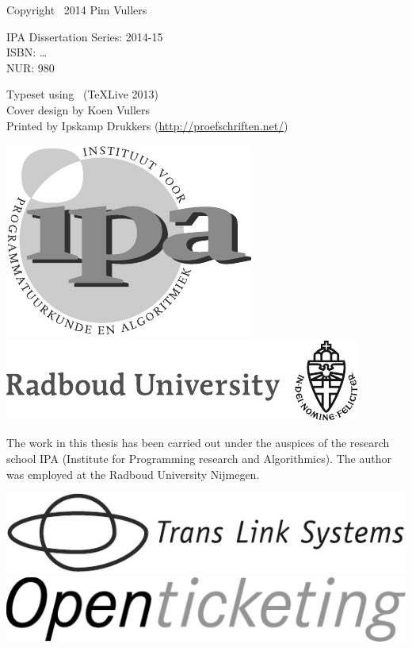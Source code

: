 \thispagestyle{empty}

\noindent
Copyright \textcopyright\ 2014 Pim Vullers \\\null

\noindent
IPA Dissertation Series: 2014-15 \\
ISBN: \dots \\
NUR: 980 \\\null

\noindent 
Typeset using \LaTeXe\ (\TeX Live 2013) \\
Cover design by Koen Vullers \\
Printed by Ipskamp Drukkers (\url{http://proefschriften.net/}) \\\null

\vspace{40mm}

\begin{center}
\includegraphics[scale=.7,valign=M,raise=.5ex]{images/ipalogo}
\qquad
\includegraphics[valign=M,raise=.5ex]{images/radboudlogo}
\end{center}

\noindent
The work in this thesis has been carried out under the auspices of the research school IPA (Institute for Programming research and Algorithmics).
The author was employed at the Radboud University Nijmegen.

\vspace{15mm}

\begin{center}
\includegraphics[width=.45\textwidth,valign=M,raise=.5ex]{images/tlslogo}
\qquad
\includegraphics[width=.45\textwidth,valign=M,raise=.5ex]{images/openticketinglogo}
\end{center}

